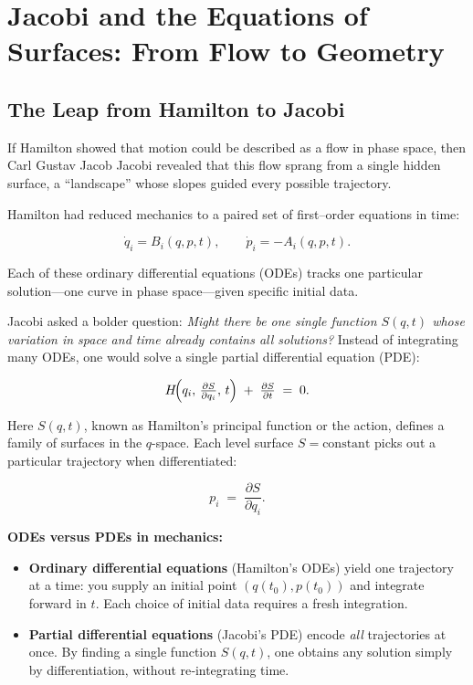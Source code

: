 \section{Jacobi and the Equations of Surfaces: From Flow to Geometry}


\subsection{The Leap from Hamilton to Jacobi}

If Hamilton showed that motion could be described as a flow in phase space,  
then Carl Gustav Jacob Jacobi revealed that this flow sprang from a single hidden surface,  
a “landscape” whose slopes guided every possible trajectory.

Hamilton had reduced mechanics to a paired set of first–order equations in time:

\[
\dot q_i = B_i(q,p,t), 
\qquad
\dot p_i = -A_i(q,p,t).
\]

Each of these ordinary differential equations (ODEs) tracks one particular solution—one curve in phase space—given specific initial data.

Jacobi asked a bolder question:  
\emph{Might there be one single function \(S(q,t)\) whose variation in space and time already contains all solutions?}  
Instead of integrating many ODEs, one would solve a single partial differential equation (PDE):

\[
H\!\Bigl(q_i,\,\tfrac{\partial S}{\partial q_i},\,t\Bigr)
\;+\;
\tfrac{\partial S}{\partial t}
\;=\;
0.
\]

Here \(S(q,t)\), known as Hamilton’s principal function or the action, defines a family of surfaces in the \(q\)-space.  Each level surface \(S=\text{constant}\) picks out a particular trajectory when differentiated:

\[
p_i \;=\;\frac{\partial S}{\partial q_i}.
\]

\textbf{ODEs versus PDEs in mechanics:}

\begin{itemize}
  \item \textbf{Ordinary differential equations} (Hamilton’s ODEs) yield one trajectory at a time: you supply an initial point \((q(t_0),p(t_0))\) and integrate forward in \(t\).  Each choice of initial data requires a fresh integration.
  \item \textbf{Partial differential equations} (Jacobi’s PDE) encode \emph{all} trajectories at once.  By finding a single function \(S(q,t)\), one obtains any solution simply by differentiation, without re‐integrating time.
\end{itemize}

